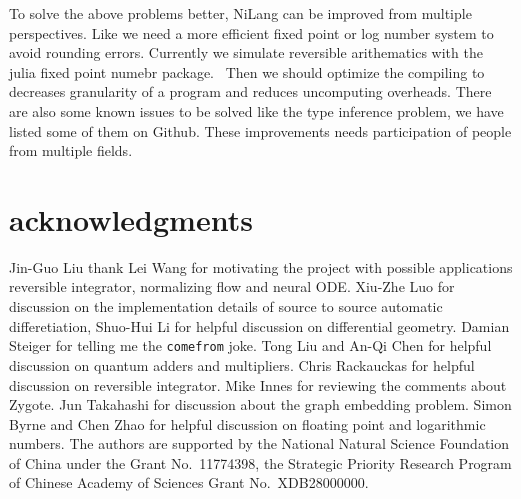 \documentclass[aps,twocolumn,longbibliography,english,superscriptaddress]{revtex4-1}
\newcommand{\<}{\langle}
\renewcommand{\>}{\rangle}
\newcommand{\blue}[1]{[{\bf  \color{blue}{JG: #1}}]}
\theoremstyle{definition}\newtheorem{definition}{\textit{Definition}}
\begin{document}
To solve the above problems better, NiLang can be improved from multiple perspectives.
Like we need a more efficient fixed point or log number system to avoid rounding errors. Currently we simulate reversible arithematics with the julia fixed point numebr package.~\cite{FixedPointNumbers}
Then we should optimize the compiling to decreases granularity of a program and reduces uncomputing overheads.
There are also some known issues to be solved like the type inference problem, we have listed some of them on Github.
These improvements needs participation of people from multiple fields.


\section{acknowledgments}
Jin-Guo Liu thank Lei Wang for motivating the project with possible applications reversible integrator, normalizing flow and neural ODE.
Xiu-Zhe Luo for discussion on the implementation details of source to source automatic differetiation,
Shuo-Hui Li for helpful discussion on differential geometry.
Damian Steiger for telling me the \texttt{comefrom} joke.
Tong Liu and An-Qi Chen for helpful discussion on quantum adders and multipliers.
Chris Rackauckas for helpful discussion on reversible integrator.
Mike Innes for reviewing the comments about Zygote.
Jun Takahashi for discussion about the graph embedding problem.
Simon Byrne and Chen Zhao for helpful discussion on floating point and logarithmic numbers.
The authors are supported by the National Natural Science Foundation of China under the Grant No.~11774398, the Strategic Priority Research Program of Chinese Academy of Sciences Grant No.~XDB28000000.




\pagebreak
\appendix
\end{document}

